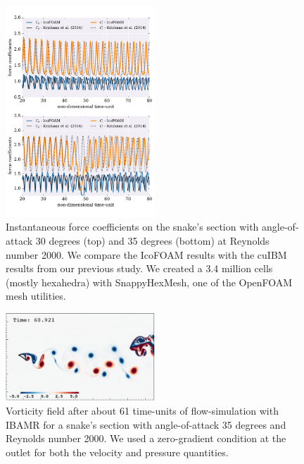 \documentclass[9pt,twocolumn,twoside]{article}
\begin{document}
\begin{figure}[t]
\centering
\includegraphics[width=0.5\textwidth]{./figures/openfoam/openfoam_forceCoefficientsRe2000.pdf}
\caption{
Instantaneous force coefficients on the snake's section with angle-of-attack 30 degrees (top) and 35 degrees (bottom) at Reynolds number 2000.
We compare the IcoFOAM results with the cuIBM results from our previous study.
We created a 3.4 million cells (mostly hexahedra) with SnappyHexMesh, one of the OpenFOAM mesh utilities.
}
\label{figure4}
\end{figure}


\begin{figure}
\centering
\includegraphics[width=0.5\textwidth]{./figures/ibamr/ibamr_vorticity56Re2000AoA35_zeroGradientOutlet.pdf}
\caption{
Vorticity field after about 61 time-units of flow-simulation with IBAMR for a snake's section with angle-of-attack 35 degrees and Reynolds number 2000.
We used a zero-gradient condition at the outlet for both the velocity and pressure quantities.
}
\label{figure5}
\end{figure}
\end{document}
